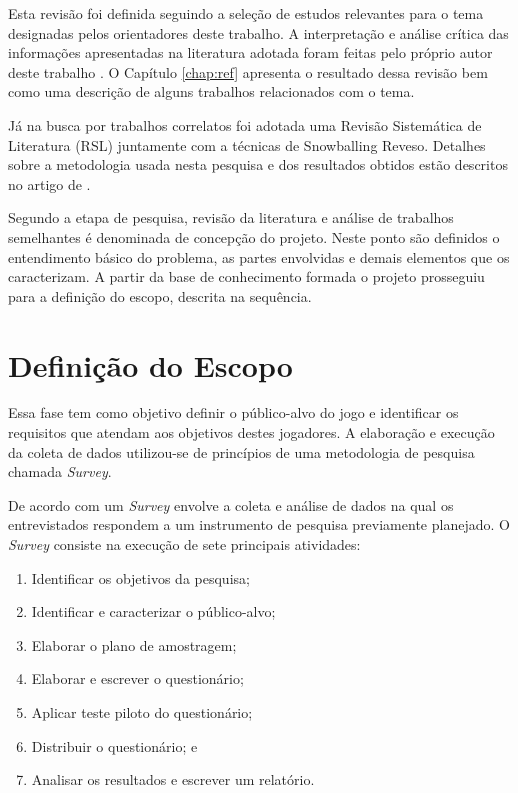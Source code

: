 Esta revisão foi definida seguindo a seleção de estudos relevantes para o tema designadas pelos orientadores deste trabalho. A interpretação e análise crítica das informações apresentadas na literatura adotada foram feitas pelo próprio autor deste trabalho \cite{ROTHER2007}. O Capítulo \ref{chap:ref} apresenta o resultado dessa revisão bem como uma descrição de alguns trabalhos relacionados com o tema. 

Já na busca por trabalhos correlatos foi adotada uma Revisão Sistemática de Literatura (RSL) juntamente com a técnicas de Snowballing Reveso. Detalhes sobre a metodologia usada nesta pesquisa e dos resultados obtidos estão descritos no artigo de .

Segundo  a etapa de pesquisa, revisão da literatura e análise de trabalhos semelhantes é denominada de concepção do projeto. Neste ponto são definidos o entendimento básico do problema, as partes envolvidas e demais elementos que os caracterizam. A partir da base de conhecimento formada o projeto prosseguiu para a definição do escopo, descrita na sequência.

\section{Definição do Escopo}

Essa fase tem como objetivo definir o público-alvo do jogo e identificar os requisitos que atendam aos objetivos destes jogadores. A elaboração e execução da coleta de dados utilizou-se de princípios de uma metodologia de pesquisa chamada \textit{Survey}. 

De acordo com  um \textit{Survey} envolve a coleta e análise de dados na qual os entrevistados respondem a um instrumento de pesquisa previamente planejado. O \textit{Survey} consiste na execução de sete principais atividades:

\begin{enumerate}
    \item Identificar os objetivos da pesquisa;
    \item Identificar e caracterizar o público-alvo;
    \item Elaborar o plano de amostragem;
    \item Elaborar e escrever o questionário;
    \item Aplicar teste piloto do questionário;
    \item Distribuir o questionário; e
    \item Analisar os resultados e escrever um relatório.
\end{enumerate}

